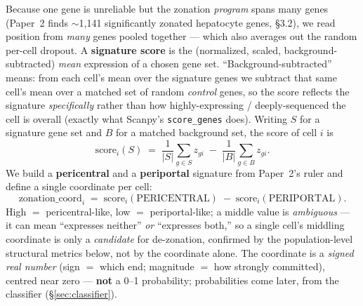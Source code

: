 \documentclass[11pt]{article}
\newcommand{\code}[1]{\texttt{#1}}
\begin{document}
Because one gene is unreliable but the zonation \emph{program} spans many genes (Paper~2 finds
$\sim$1{,}141 significantly zonated hepatocyte genes, \S3.2), we read position from \emph{many} genes
pooled together --- which also averages out the random per-cell dropout. A \textbf{signature score} is
the (normalized, scaled, background-subtracted) \emph{mean} expression of a chosen gene set.
``Background-subtracted'' means: from each cell's mean over the signature genes we subtract that same
cell's mean over a matched set of random \emph{control} genes, so the score reflects the signature
\emph{specifically} rather than how highly-expressing / deeply-sequenced the cell is overall (exactly
what Scanpy's \code{score\_genes} does). Writing $S$ for a signature gene set and $B$ for a matched
background set, the score of cell $i$ is
\begin{equation}
\text{score}_i(S) \;=\; \frac{1}{|S|}\sum_{g\in S} z_{gi}\;-\;\frac{1}{|B|}\sum_{g\in B} z_{gi}.
\end{equation}
We build a \textbf{pericentral} and a \textbf{periportal} signature from Paper~2's ruler and define a
single coordinate per cell:
\begin{equation}
\boxed{\ \text{zonation\_coord}_i \;=\; \text{score}_i(\mathrm{PERICENTRAL}) \;-\;
\text{score}_i(\mathrm{PERIPORTAL}).\ }
\end{equation}
High $=$ pericentral-like, low $=$ periportal-like; a middle value is \emph{ambiguous} --- it can mean
``expresses neither'' \emph{or} ``expresses both,'' so a single cell's middling coordinate is only a
\emph{candidate} for de-zonation, confirmed by the population-level structural metrics below, not by the
coordinate alone. The coordinate is a \emph{signed real number} (sign $=$ which end; magnitude $=$ how
strongly committed), centred near zero --- \textbf{not} a 0--1 probability; probabilities come later,
from the classifier (\S\ref{sec:classifier}).
\end{document}
